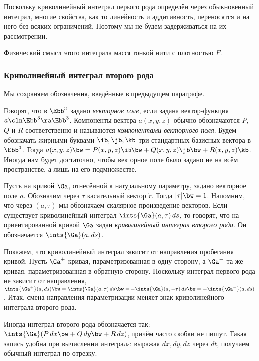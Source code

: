 \documentclass[a4paper]{article}
\begin{document}
Поскольку криволинейный интеграл первого рода определён через обыкновенный интеграл, многие
свойства, как то линейность и аддитивность, переносятся и на него без всяких ограничений. Поэтому
мы не будем задерживаться на их рассмотрении.

\begin{note}
Физический смысл этого интеграла масса тонкой нити с плотностью $F$.
\end{note}

\subsubsection{Криволинейный интеграл второго рода}
Мы сохраняем обозначения, введённые в предыдущем параграфе.

\begin{df}
Говорят, что в $\Ebb^3$ задано \emph{векторное поле}, если задана вектор-функция $a\cln \Ebb^3 \ra \Ebb^3$.
Компоненты вектора $a(x,y,z)$ обычно обозначаются $P$, $Q$ и $R$ соответственно и называются
\emph{компонентами векторного поля}. Будем обозначать жирными буквами $\ib, \jb, \kb$ три стандартных
базисных вектора в $\Ebb^3$. Тогда $a(x,y,z) \bw= P(x,y,z)\ib \bw+ Q(x,y,z)\jb \bw+ R(x,y,z)\kb$. Иногда нам
будет достаточно, чтобы векторное поле было задано не на всём пространстве, а лишь на его подмножестве.
\end{df}

\begin{df}
Пусть на кривой $\Ga$, отнесённой к натуральному параметру, задано векторное поле $a$. Обозначим через $\tau$
касательный вектор $\dot r$. Тогда $|\tau| \bw= 1$. Напомним, что через $(a,\tau)$ мы обозначаем скалярное
произведение векторов. Если существует криволинейный интеграл $\ints{\Ga}(a,\tau)\,ds$, то говорят, что на
ориентированной кривой $\Ga$ задан \emph{криволинейный интеграл второго рода}. Он обозначается
$\ints{\Ga}(a,ds)$.
\end{df}

Покажем, что криволинейный интеграл зависит от направления пробегания кривой. Пусть $\Ga^+$ кривая,
параметризованная в одну сторону, а $\Ga^-$ та же кривая, параметризованная в обратную сторону. Поскольку
интеграл первого рода не зависит от направления, $\ints{\Ga^+} (a,ds) \bw= \ints{\Ga}(a,\tau)\,ds \bw=
-\ints{\Ga}(a,-\tau)\,ds \bw= -\ints{\Ga^-}(a,ds)$. Итак, смена направления параметризации меняет знак
криволинейного интеграла второго рода.

Иногда интеграл второго рода обозначается так: $\ints{\Ga}(P\,dx \bw+ Q\,dy \bw+ R\,dz)$, причём часто
скобки не пишут. Такая запись удобна при вычислении интеграла: выражая $dx, dy, dz$ через $dt$,
получаем обычный интеграл по отрезку.
\end{document}
